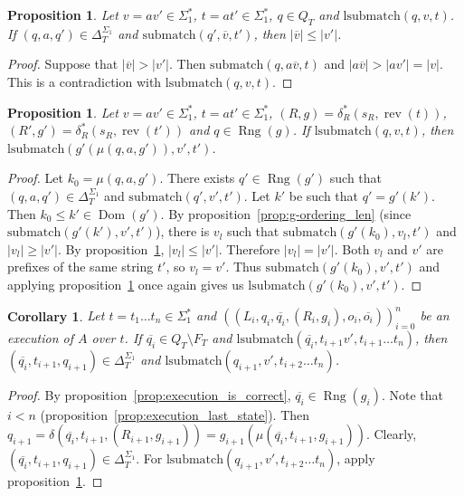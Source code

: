 \documentclass{article}
\newtheorem{proposition}[definition]{Proposition}
\newtheorem{corollary}[definition]{Corollary}
\newcommand{\len}[1]{\ensuremath{\left| #1 \right|}}
\DeclareMathOperator{\Dom}{Dom}
\DeclareMathOperator{\Rng}{Rng}
\DeclareMathOperator{\rev}{rev}
\begin{document}
	\begin{proposition} \label{prop:split_monotonic}
		Let $v=av'\in \Sigma_1^*$, $t=at'\in \Sigma_1^*$, $q\in Q_T$ and $\mathrm{lsubmatch}(q, v, t)$.
		If $(q, a, q')\in \Delta_T^{\Sigma_1}$ and $\mathrm{submatch}(q', \overline{v}, t')$, then $\len{\overline{v}}\le \len{v'}$.
	\end{proposition}
	\begin{proof}
		Suppose that $\len{\overline{v}} > \len{v'}$. Then $\mathrm{submatch}(q, a\overline{v}, t)$ and $\len{a\overline{v}} > \len{av'} = \len{v}$. This is a contradiction with $\mathrm{lsubmatch}(q, v, t)$.
	\end{proof}

	\begin{proposition} \label{prop:choose_g-min}
		Let $v=av'\in \Sigma_1^*$, $t=at'\in \Sigma_1^*$, $(R, g) = \delta_R^*(s_R, \rev(t))$, $(R', g') = \delta_R^*(s_R, \rev(t'))$ and $q\in \Rng(g)$. If $\mathrm{lsubmatch}(q, v, t)$, then $\mathrm{lsubmatch}(g'(\mu(q, a, g')), v', t')$.
	\end{proposition}
	\begin{proof}
		Let $k_0=\mu(q, a, g')$.
		There exists $q'\in \Rng(g')$ such that $(q, a, q')\in \Delta_T^{\Sigma_1}$ and $\mathrm{submatch}(q', v', t')$. Let $k'$ be such that $q'=g'(k')$. Then $k_0\le k'\in \Dom(g')$.
		By proposition~\ref{prop:g-ordering_len} (since $\mathrm{submatch}(g'(k'), v', t')$), there is $v_l$ such that
		$\mathrm{submatch}(g'(k_0), v_l, t')$ and $\len{v_l}\ge \len{v'}$. By proposition~\ref{prop:split_monotonic}, $\len{v_l}\le \len{v'}$. Therefore $\len{v_l} = \len{v'}$. Both $v_l$ and $v'$ are prefixes of the same string $t'$, so $v_l = v'$.
		Thus $\mathrm{submatch}(g'(k_0), v', t')$ and applying proposition~\ref{prop:split_monotonic} once again gives us $\mathrm{lsubmatch}(g'(k_0), v', t')$.
	\end{proof}

	\begin{corollary} \label{cor:choose_g-min}
		Let $t=t_1\ldots t_n\in \Sigma_1^*$ and $((L_i, q_i, \overline{q_i}, (R_i, g_i), o_i, \overline{o_i}))_{i=0}^n$ be an execution of $A$ over $t$.
		If $\overline{q_i}\in Q_T\setminus F_T$ and $\mathrm{lsubmatch}(\overline{q_i}, t_{i+1}v', t_{i+1}\ldots t_n)$, then $(\overline{q_i}, t_{i+1}, q_{i+1})\in \Delta_T^{\Sigma_1}$ and $\mathrm{lsubmatch}(q_{i+1}, v', t_{i+2}\ldots t_n)$.
	\end{corollary}
	\begin{proof}
		By proposition~\ref{prop:execution_is_correct}, $\overline{q_i}\in\Rng(g_i)$. Note that $i < n$ (proposition~\ref{prop:execution_last_state}).
		Then $q_{i+1} = \delta(\overline{q_i}, t_{i+1}, (R_{i+1}, g_{i+1})) = g_{i+1}(\mu(\overline{q_i}, t_{i+1}, g_{i+1}))$.
		Clearly, $(\overline{q_i}, t_{i+1}, q_{i+1})\in \Delta_T^{\Sigma_1}$. For $\mathrm{lsubmatch}(q_{i+1}, v', t_{i+2}\ldots t_n)$, apply proposition~\ref{prop:choose_g-min}.
	\end{proof}
\end{document}

